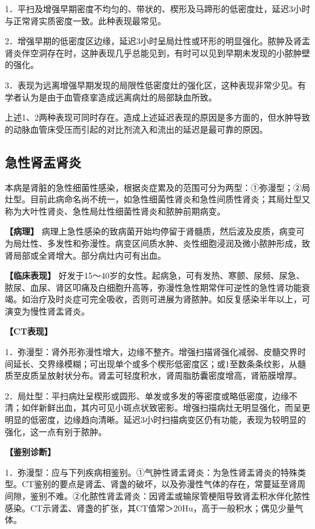 1．平扫及增强早期密度不均匀的、带状的、楔形及马蹄形的低密度灶，延迟3小时与正常肾实质密度一致。此种表现最常见。

2．增强早期的低密度区边缘，延迟3小时呈局灶性或环形的明显强化。脓肿及肾盂肾炎伴空洞存在时，这肿表现几乎总能见到，有时可以见到早期未发现的小脓肿壁的强化。

3．表现为远离增强早期发现的局限性低密度灶的强化区，这种表现非常少见。有学者认为是由于血管痉挛造成远离病灶的局部缺血所致。

上述1、2两种表现可同时存在。造成上述延迟表现的原因是多方面的，但水肿导致的动脉血管床受压而引起的对比剂流入和流出的延迟是最可靠的原因。

\subsection{急性肾盂肾炎}

本病是肾脏的急性细菌性感染，根据炎症累及的范围可分为两型：①弥漫型；②局灶型。目前此病命名尚不统一，如急性细菌性肾炎和急性间质性肾炎；其局灶型又称为大叶性肾炎、急性局灶性细菌性肾炎和脓肿前期病变。

\textbf{【病理】}
病理上急性感染的致病菌开始均停留于肾髓质，然后波及皮质，病变可为局灶性、多发性和弥漫性。病变区间质水肿、炎性细胞浸润及微小脓肿形成，致肾局部或全肾增大。部分病灶内可有出血。

\textbf{【临床表现】}
好发于15～40岁的女性。起病急，可有发热、寒颤、尿频、尿急、脓尿、血尿、肾区叩痛及白细胞升高等，弥漫性急性期常伴可逆性的急性肾功能衰竭。如治疗及时炎症可完全吸收，否则可进展为肾脓肿。如反复感染半年以上，可演变为慢性肾盂肾炎。

\textbf{【CT表现】}

1．弥漫型：肾外形弥漫性增大，边缘不整齐。增强扫描肾强化减弱、皮髓交界时间延长、交界缘模糊；可出现单个或多个楔形低密度区；或1至数条条纹影，从髓质至皮质呈放射状分布。肾盂可轻度积水，肾周脂肪囊密度增高，肾筋膜增厚。

2．局灶型：平扫病灶呈楔形或圆形、单发或多发的等密度或略低密度，边缘不清；如伴新鲜出血，其内可见小斑点状致密影。增强扫描病灶无明显强化，而呈更明显的低密度，边缘趋向清晰。延迟3小时扫描病变区仍有功能，表现为较明显的强化，这一点有别于脓肿。

\textbf{【鉴别诊断】}

1．弥漫型：应与下列疾病相鉴别。①气肿性肾盂肾炎：为急性肾盂肾炎的特殊类型。CT鉴别的要点是肾盂、肾盏的破坏，以及弥漫性气体的存在，常蔓延至肾周间隙，鉴别不难。②化脓性肾盂肾炎：因肾盂或输尿管梗阻导致肾盂积水伴化脓性感染。CT示肾盂、肾盏的扩张，其CT值常＞20Hu，高于一般积水；偶见少量气体。

